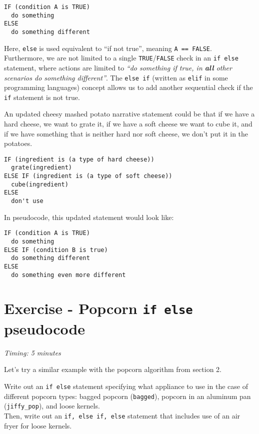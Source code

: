 \documentclass[
]{book}
\begin{document}
\begin{verbatim}
IF (condition A is TRUE)
  do something
ELSE 
  do something different
\end{verbatim}

Here, \texttt{else} is used equivalent to ``if not true'', meaning \texttt{A\ ==\ FALSE}.\\

Furthermore, we are not limited to a single \texttt{TRUE}/\texttt{FALSE} check in an \texttt{if\ else} statement, where actions are limited to \emph{``do something if true, in \textbf{all} other scenarios do something different''}. The \texttt{else\ if} (written as \texttt{elif} in some programming languages) concept allows us to add another sequential check if the \texttt{if} statement is not true.

An updated cheesy mashed potato narrative statement could be that if we have a hard cheese, we want to grate it, if we have a soft cheese we want to cube it, and if we have something that is neither hard nor soft cheese, we don't put it in the potatoes.

\begin{verbatim}
IF (ingredient is (a type of hard cheese))
  grate(ingredient)
ELSE IF (ingredient is (a type of soft cheese))
  cube(ingredient)
ELSE
  don't use
\end{verbatim}

In pseudocode, this updated statement would look like:

\begin{verbatim}
IF (condition A is TRUE)
  do something
ELSE IF (condition B is true)
  do something different
ELSE 
  do something even more different
\end{verbatim}

\section{\texorpdfstring{Exercise - Popcorn \texttt{if\ else} pseudocode}{Exercise - Popcorn if else pseudocode}}\label{exercise---popcorn-if-else-pseudocode}

\emph{Timing: 5 minutes}

Let's try a similar example with the popcorn algorithm from section 2.

Write out an \texttt{if\ else} statement specifying what appliance to use in the case of
different popcorn types: bagged popcorn (\texttt{bagged}), popcorn in an aluminum pan (\texttt{jiffy\_pop}),
and loose kernels.\\
Then, write out an \texttt{if,\ else\ if,\ else} statement that includes use of an air fryer for loose kernels.\\
\end{document}
